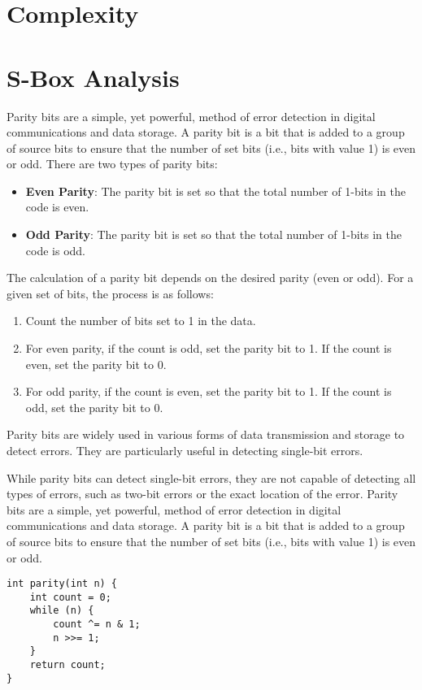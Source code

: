 \section{Complexity}

\newpage
\section{S-Box Analysis}

\begin{note}
Parity bits are a simple, yet powerful, method of error detection in digital communications and data storage. A parity bit is a bit that is added to a group of source bits to ensure that the number of set bits (i.e., bits with value 1) is even or odd.
There are two types of parity bits:
\begin{itemize}
	\item \textbf{Even Parity}: The parity bit is set so that the total number of 1-bits in the code is even.
	\item \textbf{Odd Parity}: The parity bit is set so that the total number of 1-bits in the code is odd.
\end{itemize}
The calculation of a parity bit depends on the desired parity (even or odd). For a given set of bits, the process is as follows:
\begin{enumerate}
	\item Count the number of bits set to 1 in the data.
	\item For even parity, if the count is odd, set the parity bit to 1. If the count is even, set the parity bit to 0.
	\item For odd parity, if the count is even, set the parity bit to 1. If the count is odd, set the parity bit to 0.
\end{enumerate}
Parity bits are widely used in various forms of data transmission and storage to detect errors. They are particularly useful in detecting single-bit errors.

While parity bits can detect single-bit errors, they are not capable of detecting all types of errors, such as two-bit errors or the exact location of the error.
Parity bits are a simple, yet powerful, method of error detection in digital communications and data storage. A parity bit is a bit that is added to a group of source bits to ensure that the number of set bits (i.e., bits with value 1) is even or odd. 
\end{note}

\begin{lstlisting}[style=C]
int parity(int n) {
	int count = 0;
	while (n) {
		count ^= n & 1;
		n >>= 1;
	}
	return count;
}
\end{lstlisting}

